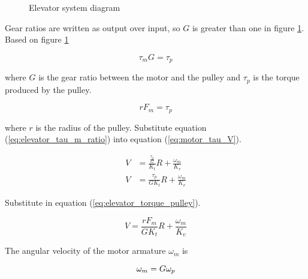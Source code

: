 \begin{figure}[H]

  \caption{Elevator system diagram}
  \label{fig:elevator}
\end{figure}

Gear ratios are written as output over input, so $G$ is greater than one in
figure \ref{fig:elevator}. \\

Based on figure \ref{fig:elevator}

\begin{equation}
  \tau_m G = \tau_p \label{eq:elevator_tau_m_ratio}
\end{equation}

where $G$ is the gear ratio between the motor and the pulley and $\tau_p$ is the
torque produced by the pulley.

\begin{equation}
  rF_m = \tau_p \label{eq:elevator_torque_pulley}
\end{equation}

where $r$ is the radius of the pulley. Substitute equation
(\ref{eq:elevator_tau_m_ratio}) into equation (\ref{eq:motor_tau_V}).

\begin{align*}
  V &= \frac{\frac{\tau_p}{G}}{K_t} R + \frac{\omega_m}{K_v} \\
  V &= \frac{\tau_p}{GK_t} R + \frac{\omega_m}{K_v}
\end{align*}

Substitute in equation (\ref{eq:elevator_torque_pulley}).

\begin{equation}
  V = \frac{rF_m}{GK_t} R + \frac{\omega_m}{K_v} \label{eq:elevator_Vinter1}
\end{equation}

The angular velocity of the motor armature $\omega_m$ is

\begin{equation}
  \omega_m = G \omega_p \label{eq:elevator_omega_m_ratio} \\
\end{equation}

